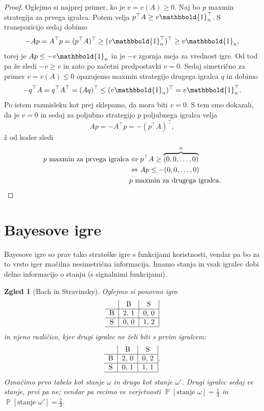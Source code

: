 \documentclass[10pt, a4paper]{article}
\newtheorem{zgled}[izr]{Zgled}
\newenvironment{noticeC}{%
  \tcolorbox[%
  notitle,
  empty,
  enhanced,  %
  breakable,
  coltext=black, 
  fontupper=\rmfamily,
  noparskip,
  sharp corners,
  boxrule=-1pt,  %
  frame hidden,
  left=7pt,  %
  right=7pt,
  top=5pt,
  bottom=5pt,
  before skip=2.5ex plus 2pt,
  after skip=2.5ex plus 2pt,
  overlay unbroken and last={%
  },
  ]}
{\endtcolorbox}
\newenvironment{dokaz}%
  {\begin{noticeC}\begin{proof}}%
  {\end{proof}\end{noticeC}}
\DeclareMathOperator{\prob}{\mathbb{P}}
\begin{document}
\begin{dokaz}
  Oglejmo si najprej primer, ko je $v = v(A) \geq 0$.
  Naj bo $p$ maxmin strategija za prvega igralca. 
  Potem velja $p^\top A \geq v \mathbbold{1}_n^\top$.
  S transpozicijo sedaj dobimo 
  $$-Ap = A^\top p = (p^\top A)^\top \geq (v \mathbbold{1}_n ^\top)^\top \geq v \mathbbold{1}_n,$$
  torej je $Ap \leq - v\mathbbold{1}_n$ in je $-v$ zgornja 
  meja za vrednost igre. Od tod pa že sledi $-v \geq v$ in zato po začetni predpostavki $v = 0$.
  Sedaj simetrično za primer $v = v(A) \leq 0$ opazujemo maxmin 
  strategijo drugega igralca $q$ in dobimo 
  $$-q^\top A = q^\top A^\top = (A q)^\top \leq (v \mathbbold{1}_n)^\top = v \mathbbold{1}_n^\top.$$
  Po istem razmisleku kot prej sklepamo, da mora biti $v = 0$.
  S tem smo dokazali, da je $v = 0$ in sedaj za poljubno strategijo $p$ poljubnega igralca velja 
  $$A p = - A^\top p = -(p^\top A)^\top,$$ž
  od koder sledi 
  \begin{align*}
    \text{$p$ maxmin za prvega igralca} &\Leftrightarrow p^\top A \geq \overbrace{(0, 0, \dots, 0)}^{n}\\
    &\Leftrightarrow A p \leq -(0, 0, \dots, 0)\\
    & \text{$p$ maxmin za drugega igralca}. \qedhere
  \end{align*}
\end{dokaz}

\section{Bayesove igre}

Bayesove igre so prav tako strateške igre s funkcijami koristnosti, vendar pa bo za to vrsto iger značilna nesimetrična informacija.
Imamo stanja in vsak igralec dobi delno informacijo o stanju (s signalnimi funkcijami).

\begin{zgled}[Bach in Stravinsky]
  Oglejmo si ponovno igro
  $${\begin{tabular}{c|c|c|}
    & B & S\\
    \hline
    B & 2, 1 & 0, 0\\
    \hline
    S & 0, 0 & 1, 2\\
    \hline
\end{tabular}}$$
in njeno različico, kjer drugi igralec ne želi biti s prvim igralcem:
$${\begin{tabular}{c|c|c|}
  & B & S\\
  \hline
  B & 2, 0 & 0, 2\\
  \hline
  S & 0, 1 & 1, 1\\
  \hline
\end{tabular}}.$$
Označimo prvo tabelo kot stanje $\omega$ in drugo kot stanje $\omega'$.
Drugi igralec sedaj ve stanje, prvi pa ne; vendar pa recimo ve verjetnosti $\prob[\text{stanje $\omega$}] = \frac{1}{3}$
in $\prob[\text{stanje $\omega'$}] = \frac{2}{3}$.
\end{zgled}
\end{document}
